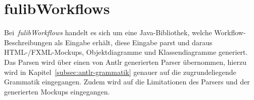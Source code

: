 \section{fulibWorkflows}\label{sec:fulibworkflows2}
Bei~\textit{fulibWorkflows} handelt es sich um eine Java-Bibliothek, welche Workflow-Beschreibungen als Eingabe erhält, diese Eingabe
parst und daraus HTML-/FXML-Mockups, Objektdiagramme und Klassendiagramme generiert.
Das Parsen wird über einen von \ac{Antlr} generierten Parser übernommen, hierzu wird in Kapitel~\ref{subsec:antlr-grammatik} genauer auf
die zugrundeliegende Grammatik eingegangen.
Zudem wird auf die Limitationen des Parsers und der generierten Mockups eingegangen.








